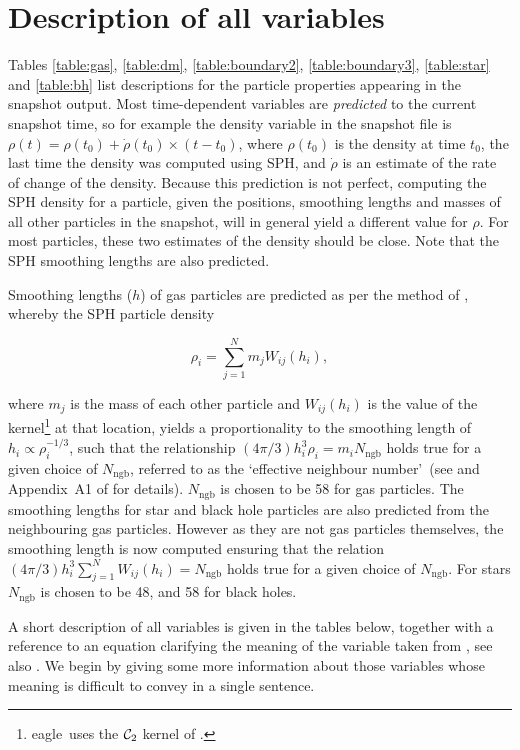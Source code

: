 \documentclass[10pt, a4paper]{article}
\newcommand{\eagle}{{\sc eagle}}
\begin{document}
\section{Description of all variables}
Tables \ref{table:gas}, \ref{table:dm}, \ref{table:boundary2}, \ref{table:boundary3}, \ref{table:star} and \ref{table:bh}
list descriptions for the particle properties appearing in the snapshot output.
Most time-dependent variables are {\em predicted} to the current snapshot time,
so for example the density variable in the snapshot file is $\rho(t) =
\rho(t_0)+\dot\rho(t_0)\times (t-t_0)$, where $\rho(t_0)$ is the density at
time $t_0$, the last time the density was computed using SPH, and $\dot\rho$ is
an estimate of the rate of change of the density. Because this prediction is
not perfect, computing the SPH density for a particle, given the positions,
smoothing lengths and masses of all other particles in the snapshot, will in
general yield a different value for $\rho$. For most particles, these two
estimates of the density should be close. Note that the SPH smoothing lengths
are also predicted.

Smoothing lengths ($h$) of gas particles are predicted as per the method of
\cite{hopkins2013}, whereby the SPH particle density

\begin{equation}
\label{eq:rho}
\rho_i = \sum_{j=1}^N m_j W_{ij}(h_i),
\end{equation}
	
\noindent where $m_j$ is the mass of each other particle and $W_{ij}(h_i)$ is
the value of the kernel\footnote{\eagle\ uses the ${\cal C}_2$ kernel of
\cite{Wendland1995}.} at that location, yields a proportionality to the
smoothing length of $h_i \propto \rho_i^{-1/3}$, such that the relationship $(4
\pi / 3) h_i^{3} \rho_i = m_i N_{\mathrm{ngb}}$ holds true for a given choice
of $N_{\mathrm{ngb}}$, referred to as the \lq effective neighbour number\rq\
(see \cite{hopkins2013} and Appendix~A1 of \cite{schaye2015} for details).
$N_{\mathrm{ngb}}$ is chosen to be 58 for gas particles. The smoothing lengths
for star and black hole particles are also predicted from the neighbouring gas
particles. However as they are not gas particles themselves, the smoothing
length is now computed ensuring that the relation $(4 \pi / 3) h_i^{3}
\sum_{j=1}^N W_{ij}(h_i) = N_{\mathrm{ngb}}$ holds true for a given choice of
$N_{\mathrm{ngb}}$. For stars $N_{\mathrm{ngb}}$ is chosen to be 48, and 58 for
black holes. 

A short description of all variables is given in the tables below, together
with a reference to an equation clarifying the meaning of the variable taken
from \cite{schaye2015}, see also \cite{mcalpine2016}. We begin by giving some
more information about those variables whose meaning is difficult to convey in
a single sentence.
\end{document}
